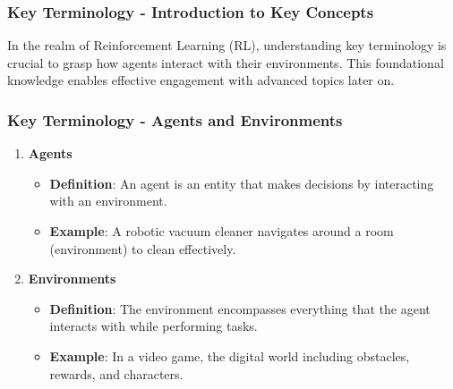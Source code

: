 \documentclass[aspectratio=169]{beamer}
\begin{document}
\begin{frame}[fragile]
    \frametitle{Key Terminology - Introduction to Key Concepts}
    In the realm of Reinforcement Learning (RL), understanding key terminology is crucial to grasp how agents interact with their environments.
    This foundational knowledge enables effective engagement with advanced topics later on.
\end{frame}

\begin{frame}[fragile]
    \frametitle{Key Terminology - Agents and Environments}
    \begin{enumerate}
        \item \textbf{Agents}
        \begin{itemize}
            \item \textbf{Definition}: An agent is an entity that makes decisions by interacting with an environment.
            \item \textbf{Example}: A robotic vacuum cleaner navigates around a room (environment) to clean effectively.
        \end{itemize}
        
        \item \textbf{Environments}
        \begin{itemize}
            \item \textbf{Definition}: The environment encompasses everything that the agent interacts with while performing tasks.
            \item \textbf{Example}: In a video game, the digital world including obstacles, rewards, and characters.
        \end{itemize}
    \end{enumerate}
\end{frame}
\end{document}
